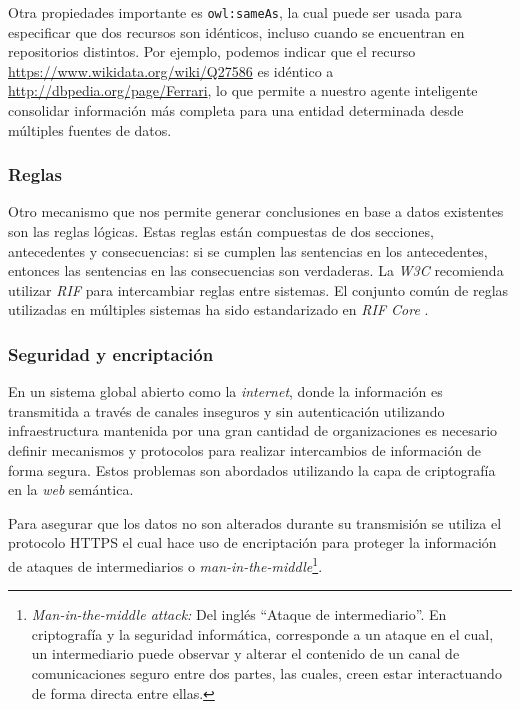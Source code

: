 Otra propiedades importante es \texttt{owl:sameAs}, la cual puede ser usada para especificar que dos recursos son idénticos, incluso cuando se encuentran en repositorios distintos. Por ejemplo, podemos indicar que el recurso \url{https://www.wikidata.org/wiki/Q27586} es idéntico a \url{http://dbpedia.org/page/Ferrari}, lo que permite a nuestro agente inteligente consolidar información más completa para una entidad determinada desde múltiples fuentes de datos.

\subsubsection{Reglas}

Otro mecanismo que nos permite generar conclusiones en base a datos existentes son las reglas lógicas. Estas reglas están compuestas de dos secciones, antecedentes y consecuencias: si se cumplen las sentencias en los antecedentes, entonces las sentencias en las consecuencias son verdaderas. La \textit{W3C} recomienda utilizar \textit{RIF} \cite{kifer2013rif} para intercambiar reglas entre sistemas. El conjunto común de reglas utilizadas en múltiples sistemas ha sido estandarizado en \textit{RIF Core} \cite{boley2010rif}.

\subsubsection{Seguridad y encriptación}

En un sistema global abierto como la \textit{internet}, donde la información es transmitida a través de canales inseguros y sin autenticación utilizando infraestructura mantenida por una gran cantidad de organizaciones es necesario definir mecanismos y protocolos para realizar intercambios de información de forma segura. Estos problemas son abordados utilizando la capa de criptografía en la \textit{web} semántica.

Para asegurar que los datos no son alterados durante su transmisión se utiliza el protocolo HTTPS \cite{rescorla2000rfc2818} el cual hace uso de encriptación para proteger la información de ataques de intermediarios o \textit{man-in-the-middle}\footnote{\textit{Man-in-the-middle attack:} Del inglés ``Ataque de intermediario''. En criptografía y la seguridad informática, corresponde a un ataque en el cual, un intermediario puede observar y alterar el contenido de un canal de comunicaciones seguro entre dos partes, las cuales, creen estar interactuando de forma directa entre ellas.}.


